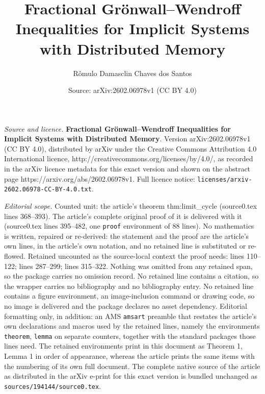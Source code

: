 \documentclass[10pt,a4paper]{amsart}
\title{\textbf{Fractional Grönwall--Wendroff Inequalities for Implicit Systems with Distributed Memory}}
\author{R\^omulo Damasclin Chaves dos Santos}
\date{Source: arXiv:2602.06978v1 (CC BY 4.0)}
\begin{document}
\maketitle

\noindent\emph{Source and licence.} \textbf{Fractional Grönwall--Wendroff Inequalities for Implicit Systems with Distributed Memory}. Version arXiv:2602.06978v1 (CC BY 4.0), distributed by arXiv under the Creative Commons Attribution 4.0 International licence, http://creativecommons.org/licenses/by/4.0/, as recorded in the arXiv licence metadata for this exact version and shown on the abstract page https://arxiv.org/abs/2602.06978v1. Full licence notice: \texttt{licenses/arxiv-2602.06978-CC-BY-4.0.txt}.\par\smallskip

\noindent\textit{Editorial scope.} Counted unit: the article's theorem thm:limit\_cycle (source0.tex lines 368--393). The article's complete original proof of it is delivered with it (source0.tex lines 395--482, one \texttt{proof} environment of 88 lines). No mathematics is written, repaired or re-derived: the statement and the proof are the article's own lines, in the article's own notation, and no retained line is substituted or re-flowed.  Retained uncounted as the source-local context the proof needs: lines 110--122; lines 287--299; lines 315--322.  Nothing was omitted from any retained span, so the package carries no omission record.  No retained line contains a citation, so the wrapper carries no bibliography and no bibliography entry.  No retained line contains a figure environment, an image-inclusion command or drawing code, so no image is delivered and the package declares no asset dependency.  Editorial formatting only, in addition: an AMS \texttt{amsart} preamble that restates the article's own declarations and macros used by the retained lines, namely the environments \texttt{theorem}, \texttt{lemma} on separate counters, together with the standard packages those lines need.  The retained environments print in this document as Theorem 1, Lemma 1 in order of appearance, whereas the article prints the same items with the numbering of its own full document.  The complete native source of the article as distributed in the arXiv e-print for this exact version is bundled unchanged as \texttt{sources/194144/source0.tex}.
\end{document}
